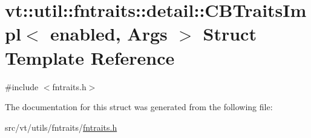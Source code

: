 \hypertarget{structvt_1_1util_1_1fntraits_1_1detail_1_1_c_b_traits_impl}{}\section{vt\+:\+:util\+:\+:fntraits\+:\+:detail\+:\+:C\+B\+Traits\+Impl$<$ enabled, Args $>$ Struct Template Reference}
\label{structvt_1_1util_1_1fntraits_1_1detail_1_1_c_b_traits_impl}


{\ttfamily \#include $<$fntraits.\+h$>$}



The documentation for this struct was generated from the following file\+:\begin{DoxyCompactItemize}
\item 
src/vt/utils/fntraits/\hyperlink{fntraits_8h}{fntraits.\+h}\end{DoxyCompactItemize}
